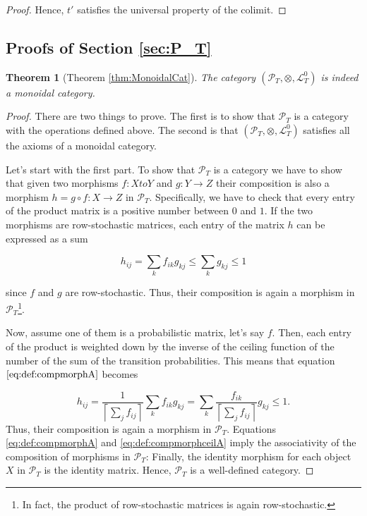 \documentclass[10pt,a4paper]{elsarticle}
\renewcommand{\L}{\mathcal{L}}
\renewcommand{\P}{\mathcal{P}}
\newtheorem{theorem}{Theorem}[section]
\begin{document}
{\begin{proof}
		Hence, $t'$ satisfies the universal property of the colimit.
	\end{proof}
	
	
	\subsection{Proofs of Section \ref{sec:P_T}}
	
	\begin{theorem}[Theorem \ref{thm:MonoidalCat}]\label{thm:MonoidalCatA}
		The category $(\P_{T},\otimes, \L_{T}^{0})$ is indeed a monoidal category.
	\end{theorem}
	
	\begin{proof}
		There are two things to prove. The first is to show that $\P_{T}$ is a category with the operations defined above. The second is that $(\P_{T},\otimes, \L_{T}^{0})$ satisfies all the axioms of a monoidal category.
		
		Let's start with the first part. To show that $\P_{T}$ is a category we have to show that given two morphisms $f\colon X to Y$ and $g\colon Y\to Z$ their composition is also a morphism $h = g\circ f\colon X\to Z$ in $\P_{T}$. Specifically, we have to check that every entry of the product matrix is a positive number between $0$ and $1$. If the two morphisms are row-stochastic matrices, each entry of the matrix $h$ can be expressed as a sum
		
		\begin{equation}\label{eq:def:compmorphA}
			h_{ij}=\sum_{k} f_{ik}g_{kj}\leq \sum_{k} g_{kj}\leq 1
		\end{equation}
		
		since $f$ and $g$ are row-stochastic. Thus, their composition is again a morphism in $\P_{T}$\footnote{In fact, the product of row-stochastic matrices is again row-stochastic.}. 
		
		
		Now, assume one of them is a probabilistic matrix, let's say $f$. Then, each entry of the product is weighted down by the inverse of the ceiling function of the number of the sum of the transition probabilities. This means that equation $\eqref{eq:def:compmorphA}$ becomes
		
		\begin{equation}\label{eq:def:compmorphceilA}
			h_{ij}= \frac{1}{\left\lceil\sum_{j}f_{ij}\right\rceil}\sum_{k} f_{ik}g_{kj} = \sum_{k} \frac{f_{ik}}{\left\lceil\sum_{j}f_{ij}\right\rceil} g_{kj}\leq 1.
		\end{equation}
		Thus, their composition is again a morphism in $\P_{T}$. Equations \eqref{eq:def:compmorphA} and \eqref{eq:def:compmorphceilA} imply the associativity of the composition of morphisms in $\P_{T}$: Finally, the identity morphism for each object $X$ in $\P_{T}$ is the identity matrix. Hence, $\P_{T}$ is a well-defined category.
		

\end{proof}}
\end{document}
